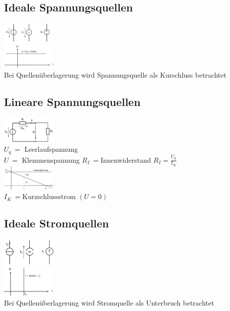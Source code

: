 \subsection{Ideale Spannungsquellen}
\begin{multicols}{4}
\includegraphics[width=0.20\textwidth]{pics/quellen/UQsymbole}\\
\includegraphics[width=0.20\textwidth]{pics/quellen/QUkennlinie}\\
Bei Quellenüberlagerung wird Spannungsquelle als Kurschluss betrachtet\\
\end{multicols}

\subsection{Lineare Spannungsquellen}
\begin{multicols}{4}
\includegraphics[width=0.20\textwidth]{pics/quellen/lUEquelle}\\
$U_q\ =$ Leerlaufspannung\\
$U\ =$ Klemmenspannung
$R_I\ =$Innenwiderstand
$R_I=\frac{U_q}{I_K}$\\
\includegraphics[width=0.20\textwidth]{pics/quellen/UIkennlinie}\\
$I_K\ =$Kurzschlussstrom $(U=0)$\\
\end{multicols}

\subsection{Ideale Stromquellen}
\begin{multicols}{4}
\includegraphics[width=0.20\textwidth]{pics/quellen/IQsymbole}\\
\includegraphics[width=0.20\textwidth]{pics/quellen/QIkennlinie}\\
Bei Quellenüberlagerung wird Stromquelle als Unterbruch betrachtet\\
\end{multicols}

